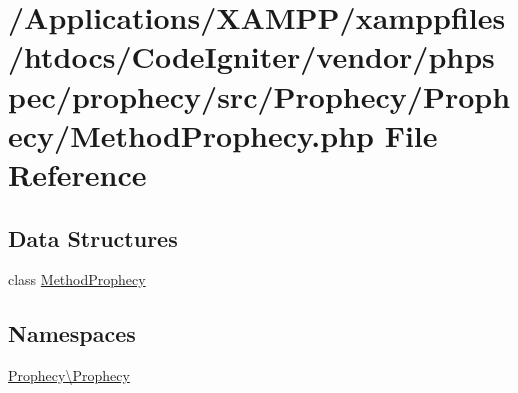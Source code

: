 \hypertarget{_method_prophecy_8php}{}\section{/\+Applications/\+X\+A\+M\+P\+P/xamppfiles/htdocs/\+Code\+Igniter/vendor/phpspec/prophecy/src/\+Prophecy/\+Prophecy/\+Method\+Prophecy.php File Reference}
\label{_method_prophecy_8php}
\subsection*{Data Structures}
\begin{DoxyCompactItemize}
\item 
class \mbox{\hyperlink{class_prophecy_1_1_prophecy_1_1_method_prophecy}{Method\+Prophecy}}
\end{DoxyCompactItemize}
\subsection*{Namespaces}
\begin{DoxyCompactItemize}
\item 
 \mbox{\hyperlink{namespace_prophecy_1_1_prophecy}{Prophecy\textbackslash{}\+Prophecy}}
\end{DoxyCompactItemize}
